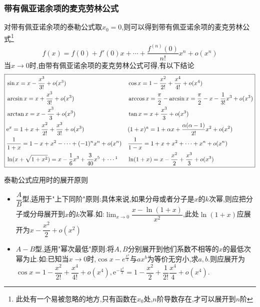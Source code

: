 \documentclass[8pt a4paper, oneside, UTF8]{ctexbook}
\begin{document}
\begin{sloppypar}
    \subsubsection{带有佩亚诺余项的麦克劳林公式}
    对带有佩亚诺余项的泰勒公式取$x_0=0$,则可以得到带有佩亚诺余项的麦克劳林公式\footnote{此处有一个易被忽略的地方,只有函数在$x_0$处,$n$阶导数存在,才可以展开到$n$阶}
    $$
    f(x)=f(0)+f'(0)x+\cdots+\dfrac{f^{(n)}(0)}{n!}x^{n}+o(x^{n})
    $$
    当$x\to 0$时,由带有佩亚诺余项的麦克劳林公式可得,有以下结论
    \begin{align*}
        \boxed{\begin{aligned}
                    & \sin x =x-\dfrac{x^3}{3!}+o(x^3)                                &  & \cos x =1-\dfrac{x^2}{2!}+\dfrac{x^4}{4!}+o(x^4)                  \\
                    & \arcsin x =x+\dfrac{x^3}{3!}+o(x^3)                             &  &                              \arccos x=\frac\pi2-\arcsin x=\frac\pi2-x-\frac1{3!}x^3+o(x^3)       \\
                    & \arctan x =x-\dfrac{x^{3}}{3}+o(x^{3})                          &  & \tan x =x+\dfrac{x^3}3+o(x^3)              \\
                    & \mathrm{e}^{x} =1+x+\dfrac{x^{2}}{2!}+\dfrac{x^{3}}{3!}+o(x^{3}) &  & (1+x)^{a} =1+\alpha x+\dfrac{\alpha(\alpha-1)}{2!}x^{2}+o(x^{2}) \\
                    & \dfrac{1}{1+x}=1-x+x^{2}-\cdots+(-1)^{n}x^{n}+o(x^{n})          &  &       \dfrac{1}{1-x}=1+x+x^{2}+\cdots+x^{n}+o(x^{n}) \\
                    & \ln (x+\sqrt{1+x^{2}})=x-\dfrac{1}{6}x^{3}+\dfrac{3}{40}x^{5}+\cdots \footnotemark[1]   & & \ln(1+x) =x-\dfrac{x^{2}}{2}+\dfrac{x^{3}}{3}+o(x^{3}) 
                \end{aligned}}
    \end{align*}
    \begin{criterion}{泰勒公式应用时的展开原则\label{tlgsyy}}{}
        \begin{itemize}
            \item $\dfrac{A}{B}$型,适用于"上下同阶"原则:具体来说,如果分母或者分子是$x$的$k$次幂,则应把分子或分母展开到$x$的$k$次幂.如:$\lim_{x\to0}\dfrac{x-\ln(1+x)}{x^{2}}$,此处$\ln(1+x)$应展开为$x-\dfrac{x^2}{2}+o(x^2)$
            \item $A-B$型,适用"幂次最低"原则:将$A,B$分别展开到他们系数不相等的$x$的最低次幂为止.如:已知当$x\to0$时,$\cos x-e^{\frac{x^2}2}$与$ax^b$为等价无穷小,求$a,b$.则应展开为$\cos x=1-\dfrac{x^2}{2!}+\dfrac{x^4}{4!}+o(x^4),\mathrm{e}^{-\frac{x^2}{2}}=1-\dfrac{x^2}{2}+\dfrac{1}{2!}\dfrac{x^4}{4}+o(x^4).$

\end{itemize}
\end{criterion}
\end{sloppypar}
\end{document}
